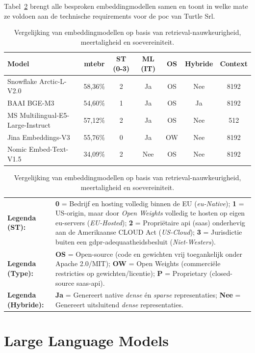 Tabel~\ref{tab:embeddingmodels} brengt alle besproken embeddingmodellen samen en toont in welke mate ze voldoen aan de technische requirements voor de \gls{poc} van Turtle Srl.

\begin{table}[ht]
\centering
\small
\begin{tabular}{lcccccc}
\toprule
\textbf{Model} & \textbf{\gls{mtebr}} & \textbf{ST (0-3)} & \textbf{ML (IT)} & \textbf{OS} & \textbf{Hybride} & \textbf{Context} \\
\midrule
Snowflake Arctic-L-V2.0            & 58,36\% & 2 & Ja  & OS  & Nee & 8192 \\
BAAI BGE-M3                        & 54,60\% & 1 & Ja  & OS  & Ja  & 8192 \\
MS Multilingual-E5-Large-Instruct  & 57,12\% & 2 & Ja  & OS  & Nee & 512  \\
Jina Embeddings-V3                 & 55,76\% & 0 & Ja  & OW  & Nee & 8192 \\
Nomic Embed-Text-V1.5              & 34,09\% & 2 & Nee & OS  & Nee & 8192 \\
\bottomrule
\end{tabular}
\caption{Vergelijking van embeddingmodellen op basis van retrieval-nauwkeurigheid, meertaligheid en soevereiniteit.}
\label{tab:embeddingmodels}
\vspace{2mm}
\centering
\footnotesize
\begin{tabular}{lp{12.5cm}}
\textbf{Legenda (ST):}      & \textbf{0} = Bedrijf en hosting volledig binnen de EU (\textit{\gls{eu}-Native}); \textbf{1} = US-origin, maar door \textit{Open Weights} volledig te hosten op eigen \gls{eu}-servers (\textit{EU-Hosted}); \textbf{2} = Propriëtaire \gls{api} (\gls{saas}) onderhevig aan de Amerikaanse CLOUD Act (\textit{US-Cloud}); \textbf{3} = Jurisdictie buiten een \gls{gdpr}-adequaatheidsbesluit (\textit{Niet-Westers}). \\
\textbf{Legenda (Type):}    & \textbf{OS} = Open-source (code en gewichten vrij toegankelijk onder Apache 2.0/MIT); \textbf{OW} = Open Weights (commerciële restricties op gewichten/licentie); \textbf{P} = Proprietary (closed-source \gls{saas}-\gls{api}). \\
\textbf{Legenda (Hybride):} & \textbf{Ja} = Genereert native \textit{dense} én \textit{sparse} representaties; \textbf{Nee} = Genereert uitsluitend \textit{dense} representaties.
\end{tabular}
\end{table}

\section{Large Language Models}
\label{sec:longlist-llm}

